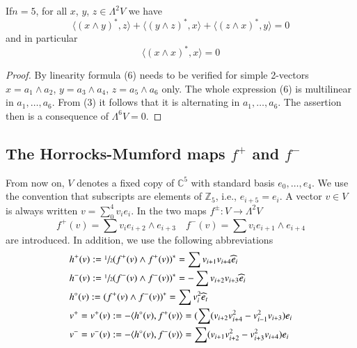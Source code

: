 \setcounter{lemma}{0}
\begin{lemma}\label{chap2-lem1}
If\pageoriginale $n=5$, for all $x$, $y$, $z\in \Lambda^{2}V$ we have
\setcounter{equation}{5}
\begin{equation}
\langle (x\wedge y)^{*},z\rangle+\langle (y\wedge
z)^{*},x\rangle+\langle (z\wedge x)^{*},y\rangle=0\label{chap2-eq6}
\end{equation}
and in particular
\begin{equation}
\langle (x\wedge x)^{*},x\rangle=0\label{chap2-eq7}
\end{equation}
\end{lemma}

\begin{proof}
By linearity formula (6) needs to be verified for simple 2-vectors
$x=a_{1}\wedge a_{2}$, $y=a_{3}\wedge a_{4}$, $z=a_{5}\wedge a_{6}$
only. The whole expression (6) is multilinear in
$a_{1},\ldots,a_{6}$. From (3) it follows that it is alternating in
$a_{1},\ldots,a_{6}$. The assertion then is a consequence of
$\Lambda^{6}V=0$. 
\end{proof}

\subsection{The Horrocks-Mumford maps \texorpdfstring{\boldmath$f^{+}$}{f+} and
\texorpdfstring{$f^{-}$}{f-}}\label{chap2-sec2.2}

From now on, $V$ denotes a fixed copy of $\mathbb{C}^{5}$ with
standard basis $e_{0},\ldots,e_{4}$. We use the convention that
subscripts are elements of $\mathbb{Z}_{5}$, i.e., $e_{i+5}=e_{i}$. A
vector $v\in V$ is always written
$v=\sum\limits^{4}_{0}v_{i}e_{i}$. In \cite{chap2-key6} the two maps
$f^{\pm}:V\to \Lambda^{2}V$
$$
f^{+}(v)=\sum v_{i}e_{i+2}\wedge e_{i+3}\quad f^{-}(v)=\sum
v_{i}e_{i+1}\wedge e_{i+4}
$$
are introduced. In addition, we use the following abbreviations
\begin{align*}
& h^{+}(v):=\sfrac{1}{2}(f^{+}(v)\wedge f^{+}(v))^{*}=\sum
v_{i+1}v_{i+4}\widehat{e}_{i}\\
& h^{-}(v):=\sfrac{1}{2}(f^{-}(v)\wedge f^{-}(v))^{*}=-\sum
v_{i+2}v_{i+3}\widehat{e}_{i}\\
& h^{\circ}(v):=(f^{+}(v)\wedge f^{-}(v))^{*}=\sum
v^{2}_{i}\widehat{e}_{t}\\
& v^{+}=v^{+}(v):=-\langle h^{\circ}(v),f^{+}(v)\rangle
=(\sum(v_{i+2}v^{2}_{i+4}-v^{2}_{i-1}v_{i+3})e_{i}\\
& v^{-}=v^{-}(v):=-\langle h^{\circ}(v),f^{-}(v)\rangle =\sum (v_{i+1}v^{2}_{i+2}-v^{2}_{i+3}v_{i+4})e_{i}
\end{align*}\pageoriginale

